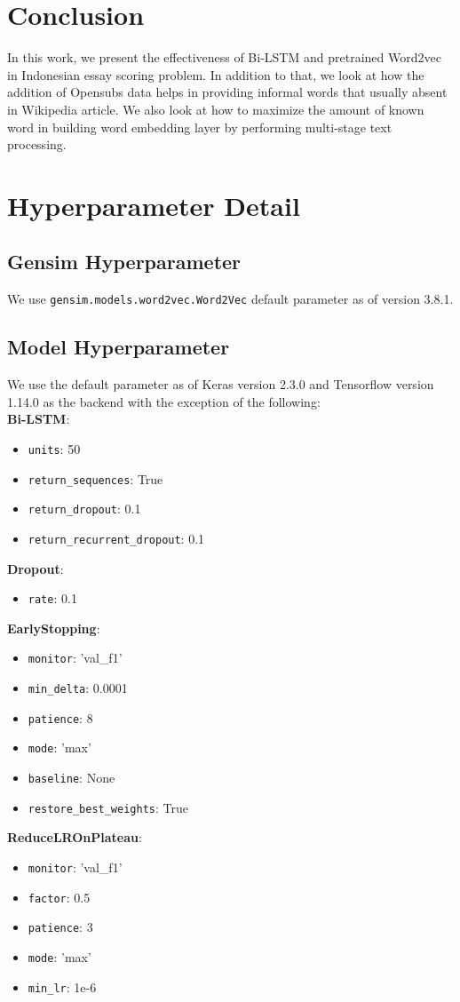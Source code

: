 \documentclass[11pt,a4paper]{article}
\begin{document}
\section{Conclusion}
In this work, we present the effectiveness of Bi-LSTM and pretrained Word2vec in Indonesian essay scoring problem. In addition to that, we look at how the addition of Opensubs data helps in providing informal words that usually absent in Wikipedia article. We also look at how to maximize the amount of known word in building word embedding layer by performing multi-stage text processing.




\appendix

\section{Hyperparameter Detail}
\subsection{Gensim Hyperparameter}
We use \verb|gensim.models.word2vec.Word2Vec| default parameter as of version 3.8.1.
\subsection{Model Hyperparameter}
We use the default parameter as of Keras version 2.3.0 and Tensorflow version 1.14.0 as the backend with the exception of the following:
\\

\textbf{Bi-LSTM}:
\begin{itemize}
\item \verb|units|: 50
\item \verb|return_sequences|: True
\item \verb|return_dropout|: 0.1
\item \verb|return_recurrent_dropout|: 0.1
\end{itemize}

\textbf{Dropout}:
\begin{itemize}
\item \verb|rate|: 0.1
\end{itemize}

\textbf{EarlyStopping}:
\begin{itemize}
\item \verb|monitor|: 'val\_f1'
\item \verb|min_delta|: 0.0001
\item \verb|patience|: 8
\item \verb|mode|: 'max'
\item \verb|baseline|: None
\item \verb|restore_best_weights|: True
\end{itemize}

\textbf{ReduceLROnPlateau}:
\begin{itemize}
\item \verb|monitor|: 'val\_f1'
\item \verb|factor|: 0.5
\item \verb|patience|: 3
\item \verb|mode|: 'max'
\item \verb|min_lr|: 1e-6
\end{itemize}
\end{document}
